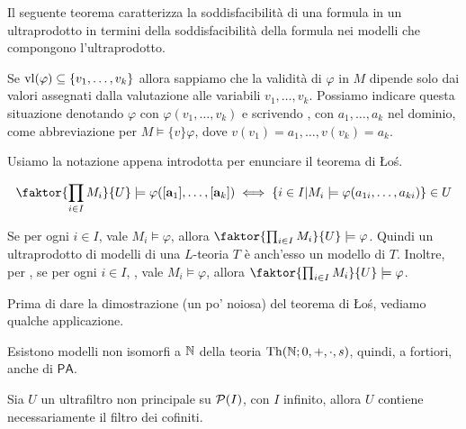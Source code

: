 Il seguente teorema caratterizza la soddisfacibilità di una formula in un ultraprodotto in termini della soddisfacibilità della formula nei modelli che compongono l'ultraprodotto.

\begin{notation}
    Se $\operatorname{vl}(\varphi) \subseteq \{v_1,\ldots,v_k\}$ allora sappiamo che la validità di $\varphi$ in $M$ dipende solo dai valori assegnati dalla valutazione alle variabili $v_1,\ldots,v_k$.
    Possiamo indicare questa situazione denotando $\varphi$ con $\varphi(v_1,\ldots,v_k)$ e scrivendo , con $a_1,\ldots,a_k$ nel dominio, 
    come abbreviazione per $M \models\{v\} \varphi$, dove $v(v_1) = a_1,\ldots,v(v_k) = a_k$.
\end{notation}

Usiamo la notazione appena introdotta per enunciare il teorema di Łoś.

\begin{theorem}
    \[ \faktor{\prod_{i \in I} M_i}{U} \models \varphi([\mathbf a_1],\ldots,[\mathbf a_k]) \iff \{i \in I | M_i \models \varphi(a_{1i},\ldots,a_{ki})\} \in U
    \]
\end{theorem}

\begin{corollary}
    Se per ogni $i \in I$, vale $M_i \models \varphi$, allora $\faktor{\prod_{i \in I} M_i}{U} \models \varphi$.
    Quindi un ultraprodotto di modelli di una $L$-teoria $T$ è anch'esso un modello di $T$. Inoltre, per ,
    se per ogni $i \in I$, , vale $M_i \models \varphi$, allora $\faktor{\prod_{i \in I} M_i}{U} \models \varphi$.
\end{corollary}

Prima di dare la dimostrazione (un po' noiosa) del teorema di Łoś, vediamo qualche applicazione.

\begin{example}
    Esistono modelli non isomorfi a $\mathbb N$ della teoria $\operatorname{Th}(\mathbb N; 0,+,\cdot,s)$, quindi, a fortiori, anche di $\mathsf{PA}$.
\end{example}

\begin{remark}
    Sia $U$ un ultrafiltro non principale su $\mathcal{P}(I)$, con $I$ infinito, allora $U$ contiene necessariamente il filtro dei cofiniti.
\end{remark}

